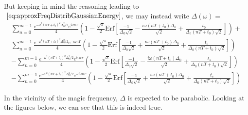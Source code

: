 But keeping in mind the reasoning leading to$~\eqref{eq:approxFreqDistribGaussianEnergy}$, we may instead write $\Delta(\omega)=$
\begin{gather}
\sum^{m-1}_{n=0}\frac{e^{-\omega^2(nT+t_0)^2\Delta^2_0/2}e^{i\omega nT}}{4}\left(1-\frac{\sqrt{\pi}}{2}\text{Erf}\left[\frac{-1}{\Delta_0\sqrt{2}}-\frac{i\omega (nT+t_0)\Delta_0}{\sqrt{2}}+\frac{t_0}{\Delta_0(nT+t_0)\sqrt{2}}\right]\right)\nonumber+\\ 
\sum^{m-1}_{n=0}\frac{e^{-\omega^2(nT+t_0)^2\Delta^2_0/2}e^{-i\omega nT}}{4}\left(1-\frac{\sqrt{\pi}}{2}\text{Erf}\left[\frac{-1}{\Delta_0\sqrt{2}}+\frac{i\omega (nT+t_0)\Delta_0}{\sqrt{2}}+\frac{t_0}{\Delta_0(nT+t_0)\sqrt{2}}\right]\right)\nonumber \\
-\sum^{m-1}_{n=0}\frac{e^{-\omega^2(nT+t_0)^2\Delta^2_0/2}e^{i\omega nT}}{4}\left(1-\frac{\sqrt{\pi}}{2}\text{Erf}\left[\frac{-1}{\Delta_0\sqrt{2}}-\frac{i\omega (nT+t_0)\Delta_0}{\sqrt{2}}+\frac{t_s}{\Delta_0(nT+t_0)\sqrt{2}}\right]\right)\nonumber \\ 
-\sum^{m-1}_{n=0}\frac{e^{-\omega^2(nT+t_0)^2\Delta^2_0/2}e^{-i\omega nT}}{4}\left(1-\frac{\sqrt{\pi}}{2}\text{Erf}\left[\frac{-1}{\Delta_0\sqrt{2}}+\frac{i\omega (nT+t_0)\Delta_0}{\sqrt{2}}+\frac{t_s}{\Delta_0(nT+t_0)\sqrt{2}}\right]\right)
\end{gather}

In the vicinity of the magic frequency, $\Delta$ is expected to be parabolic. Looking at the figures below, we can see that this is indeed true.

